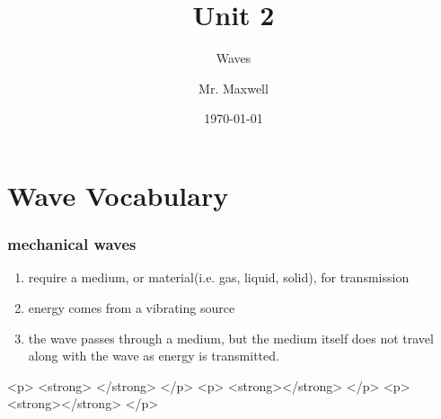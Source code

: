 \documentclass{beamer}
\title{Unit 2}
\subtitle{Waves}
\author{Mr. Maxwell}
\institute{PACS}
\date{\today}
\begin{document}
\frame{\titlepage}
\frame{\tableofcontents}

\section{Wave Vocabulary}

\begin{frame}
    \frametitle{mechanical waves}

    \begin{enumerate}
        \item require a medium, or material(i.e. gas, liquid, solid), for transmission
        \item energy comes from a vibrating source
        \item the wave passes through a medium, but the medium itself does not travel along with the wave as energy is transmitted.
    \end{enumerate}

    <p>
    <strong> </strong> 
  </p>
  <p>
    <strong></strong> 
  </p>
  <p>
    <strong></strong> 
  </p>
\end{frame}
\end{document}
